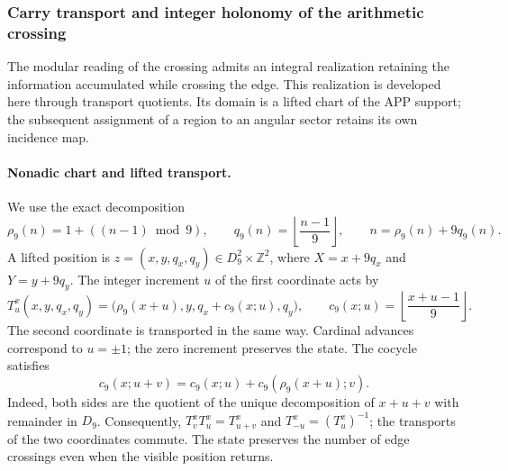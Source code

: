 \subsubsection{Carry transport and integer holonomy of the arithmetic crossing}
\label{subsec:transporte-entero-cruce}

The modular reading of the crossing admits an integral realization retaining
the information accumulated while crossing the edge. This realization
is developed here through transport quotients. Its domain is a lifted
chart of the APP support; the subsequent assignment of a region to an angular
sector retains its own incidence map.

\paragraph{Nonadic chart and lifted transport.}
We use the exact decomposition
\[
 \rho_9(n)=1+((n-1)\bmod9),\qquad
 q_9(n)=\left\lfloor\frac{n-1}{9}\right\rfloor,
 \qquad n=\rho_9(n)+9q_9(n).
\]
A lifted position is
$z=(x,y,q_x,q_y)\in D_9^2\times\mathbb Z^2$, where
$X=x+9q_x$ and $Y=y+9q_y$. The integer increment $u$ of the first
coordinate acts by
\[
 T^x_u(x,y,q_x,q_y)=
 \bigl(\rho_9(x+u),y,q_x+c_9(x;u),q_y\bigr),\qquad
 c_9(x;u)=\left\lfloor\frac{x+u-1}{9}\right\rfloor.
\]
The second coordinate is transported in the same way. Cardinal
advances correspond to $u=\pm1$; the zero increment preserves the state.
The cocycle satisfies
\[
 c_9(x;u+v)=c_9(x;u)+c_9(\rho_9(x+u);v).
\]
Indeed, both sides are the quotient of the unique decomposition of
$x+u+v$ with remainder in $D_9$. Consequently,
$T^x_vT^x_u=T^x_{u+v}$ and $T^x_{-u}=(T^x_u)^{-1}$; the transports
of the two coordinates commute. The state preserves the number of edge
crossings even when the visible position returns.


